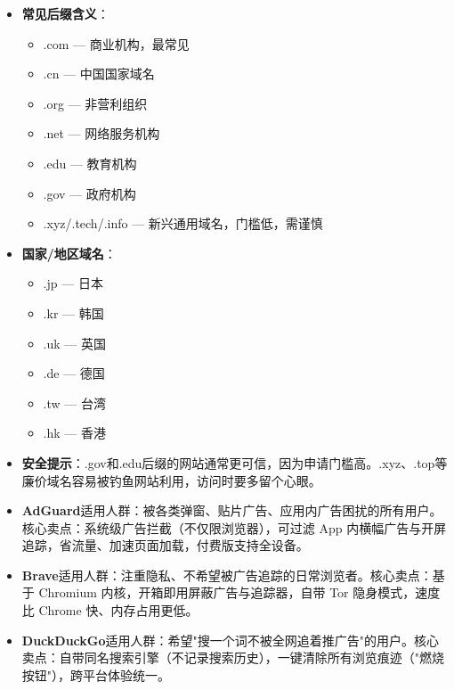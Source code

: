 \begin{itemize}
  \item \textbf{常见后缀含义}：
  \begin{itemize}
    \item .com — 商业机构，最常见
    \item .cn — 中国国家域名
    \item .org — 非营利组织
    \item .net — 网络服务机构
    \item .edu — 教育机构
    \item .gov — 政府机构
    \item .xyz/.tech/.info — 新兴通用域名，门槛低，需谨慎
  \end{itemize}
  \item \textbf{国家/地区域名}：
  \begin{itemize}
    \item .jp — 日本
    \item .kr — 韩国
    \item .uk — 英国
    \item .de — 德国
    \item .tw — 台湾
    \item .hk — 香港
  \end{itemize}
  \item \textbf{安全提示}：.gov和.edu后缀的网站通常更可信，因为申请门槛高。.xyz、.top等廉价域名容易被钓鱼网站利用，访问时要多留个心眼。
\end{itemize}


\begin{itemize}
  \item \textbf{AdGuard}适用人群：被各类弹窗、贴片广告、应用内广告困扰的所有用户。核心卖点：系统级广告拦截（不仅限浏览器），可过滤 App 内横幅广告与开屏追踪，省流量、加速页面加载，付费版支持全设备。
\end{itemize}


\begin{itemize}
  \item \textbf{Brave}适用人群：注重隐私、不希望被广告追踪的日常浏览者。核心卖点：基于 Chromium 内核，开箱即用屏蔽广告与追踪器，自带 Tor 隐身模式，速度比 Chrome 快、内存占用更低。
  \item \textbf{DuckDuckGo}适用人群：希望"搜一个词不被全网追着推广告"的用户。核心卖点：自带同名搜索引擎（不记录搜索历史），一键清除所有浏览痕迹（"燃烧按钮"），跨平台体验统一。
\end{itemize}

